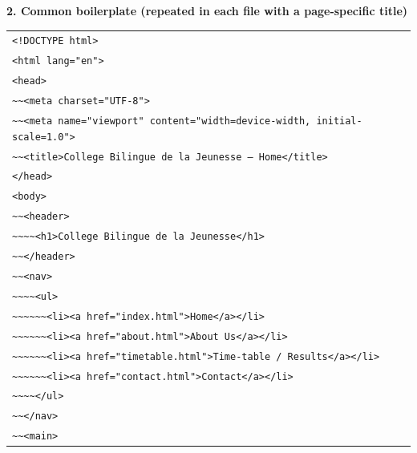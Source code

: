 \documentclass[11pt]{article}
\begin{document}
\textbf{2. Common boilerplate (repeated in each file with a page-specific title)}
\begin{center}
\begin{tabular}{l}
\texttt{<!DOCTYPE html>} \\
\texttt{<html lang="en">} \\
\texttt{<head>} \\
\texttt{\textasciitilde{}\textasciitilde{}<meta charset="UTF-8">} \\
\texttt{\textasciitilde{}\textasciitilde{}<meta name="viewport" content="width=device-width, initial-scale=1.0">} \\
\texttt{\textasciitilde{}\textasciitilde{}<title>College Bilingue de la Jeunesse -- Home</title>} \\
\texttt{</head>} \\
\texttt{<body>} \\
\texttt{\textasciitilde{}\textasciitilde{}<header>} \\
\texttt{\textasciitilde{}\textasciitilde{}\textasciitilde{}\textasciitilde{}<h1>College Bilingue de la Jeunesse</h1>} \\
\texttt{\textasciitilde{}\textasciitilde{}</header>} \\
\texttt{\textasciitilde{}\textasciitilde{}<nav>} \\
\texttt{\textasciitilde{}\textasciitilde{}\textasciitilde{}\textasciitilde{}<ul>} \\
\texttt{\textasciitilde{}\textasciitilde{}\textasciitilde{}\textasciitilde{}\textasciitilde{}\textasciitilde{}<li><a href="index.html">Home</a></li>} \\
\texttt{\textasciitilde{}\textasciitilde{}\textasciitilde{}\textasciitilde{}\textasciitilde{}\textasciitilde{}<li><a href="about.html">About Us</a></li>} \\
\texttt{\textasciitilde{}\textasciitilde{}\textasciitilde{}\textasciitilde{}\textasciitilde{}\textasciitilde{}<li><a href="timetable.html">Time-table / Results</a></li>} \\
\texttt{\textasciitilde{}\textasciitilde{}\textasciitilde{}\textasciitilde{}\textasciitilde{}\textasciitilde{}<li><a href="contact.html">Contact</a></li>} \\
\texttt{\textasciitilde{}\textasciitilde{}\textasciitilde{}\textasciitilde{}</ul>} \\
\texttt{\textasciitilde{}\textasciitilde{}</nav>} \\
\texttt{\textasciitilde{}\textasciitilde{}<main>} \\

\end{tabular}
\end{center}
\end{document}
